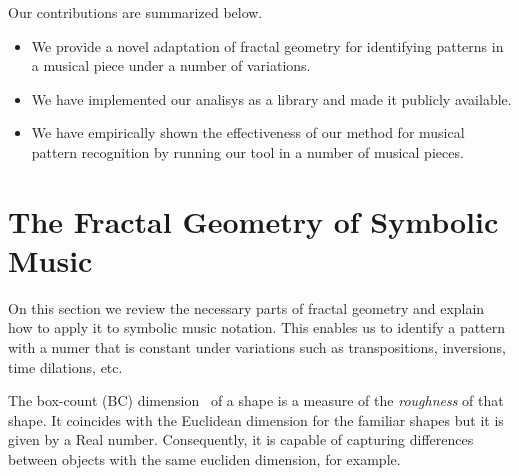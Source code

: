 

  Our contributions are summarized below.

\begin{itemize}
  \item We provide a novel adaptation of fractal geometry for identifying patterns
        in a musical piece under a number of variations.
  \item We have implemented our analisys as a library and made it publicly available.
  \item We have empirically shown the effectiveness of our method for musical pattern
        recognition by running our tool in a number of musical pieces.
\end{itemize}

\section{The Fractal Geometry of Symbolic Music}
\label{sec:fractal-geom}

  On this section we review the necessary parts of fractal geometry
and explain how to apply it to symbolic music notation. This enables
us to identify a pattern with a numer that is constant under
variations such as transpositions, inversions, time dilations, etc.

  The box-count (BC) dimension~\cite{find-a-ref} of a shape is a
measure of the \emph{roughness} of that shape. It coincides with the
Euclidean dimension for the familiar shapes but it is given by a Real number. 
Consequently, it is capable of capturing differences between objects with
the same eucliden dimension, for example.

